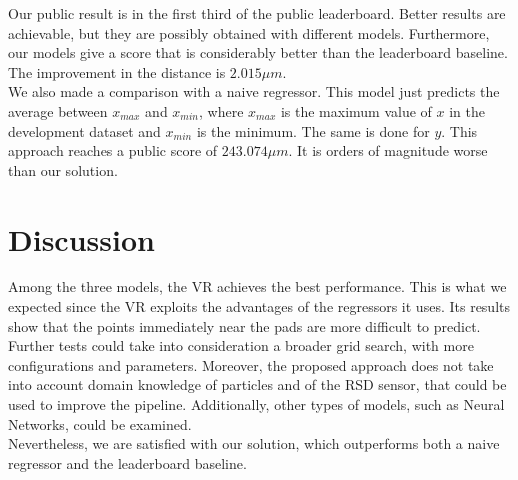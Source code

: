 \documentclass[conference]{IEEEtran}
\begin{document}
Our public result is in the first third of the public leaderboard. Better results are achievable, but they are possibly obtained with different models. Furthermore, our models give a score that is considerably better than the leaderboard baseline. The improvement in the distance is $2.015 \mu m$.\\
We also made a comparison with a naive regressor. This model just predicts the average between $x_{max}$ and $x_{min}$, where $x_{max}$ is the maximum value of $x$ in the development dataset and $x_{min}$ is the minimum. The same is done for $y$.
This approach reaches a public score of $243.074 \mu m$. It is orders of magnitude worse than our solution. \\



\section{Discussion}
Among the three models, the VR achieves the best performance. This is what we expected since the VR exploits the advantages of the regressors it uses. Its results show that the points immediately near the pads are more difficult to predict.\\ 

Further tests could take into consideration a broader grid search, with more configurations and parameters. Moreover, the proposed approach does not take into account domain knowledge of particles and of the RSD sensor, that could be used to improve the pipeline. Additionally, other types of models, such as Neural Networks, could be examined.\\
Nevertheless, we are satisfied with our solution, which outperforms both a naive regressor and the leaderboard baseline.




\end{document}
